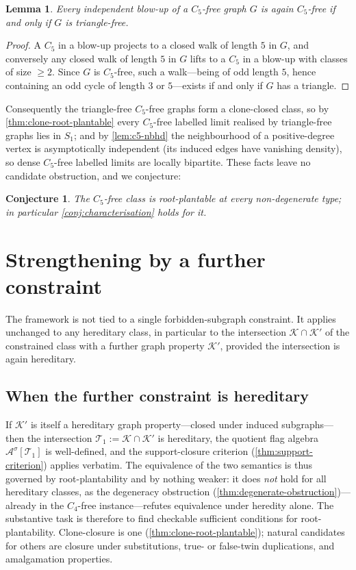 \documentclass[11pt]{article}
\newtheorem{lemma}[theorem]{Lemma}
\newtheorem{conjecture}[theorem]{Conjecture}
\theoremstyle{definition}
\newcommand{\A}{\mathcal{A}}
\newcommand{\K}{\mathcal{K}}
\newcommand{\T}{\mathcal{T}}
\begin{document}
\begin{lemma}\label{lem:c5-blowup}
Every independent blow-up of a $C_5$-free graph $G$ is again $C_5$-free if and only
if $G$ is triangle-free.
\end{lemma}

\begin{proof}
A $C_5$ in a blow-up projects to a closed walk of length $5$ in $G$, and conversely
any closed walk of length $5$ in $G$ lifts to a $C_5$ in a blow-up with classes of
size $\ge2$.  Since $G$ is $C_5$-free, such a walk---being of odd length $5$, hence
containing an odd cycle of length $3$ or $5$---exists if and only if $G$ has a
triangle.
\end{proof}

Consequently the triangle-free $C_5$-free graphs form a clone-closed class, so by
\cref{thm:clone-root-plantable} every $C_5$-free labelled limit realised by
triangle-free graphs lies in $S_1$; and by \cref{lem:c5-nbhd} the
neighbourhood of a positive-degree vertex is asymptotically independent (its induced
edges have vanishing density), so dense $C_5$-free labelled limits are locally bipartite.
These facts leave no candidate obstruction, and we conjecture:

\begin{conjecture}\label{conj:c5}
The $C_5$-free class is root-plantable at every non-degenerate type; in particular
\cref{conj:characterisation} holds for it.
\end{conjecture}

\section{Strengthening by a further constraint}

The framework is not tied to a single forbidden-subgraph constraint.  It applies
unchanged to any hereditary class, in particular to the intersection $\K\cap\K'$ of the
constrained class with a further graph property $\K'$, provided the intersection is again
hereditary.

\subsection{When the further constraint is hereditary}

If $\K'$ is itself a hereditary graph property---closed under induced subgraphs---then the
intersection $\T_1:=\K\cap\K'$ is hereditary, the quotient flag algebra $\A^\sigma[\T_1]$
is well-defined, and the support-closure criterion (\cref{thm:support-criterion}) applies
verbatim.  The equivalence of the two semantics is thus governed by root-plantability and
by nothing weaker: it does \emph{not} hold for all hereditary classes, as the degeneracy
obstruction (\cref{thm:degenerate-obstruction})---already in the $C_4$-free
instance---refutes equivalence under heredity alone.  The substantive task is therefore
to find checkable sufficient conditions for root-plantability.  Clone-closure is one
(\cref{thm:clone-root-plantable}); natural candidates for others are closure under
substitutions, true- or false-twin duplications, and amalgamation properties.
\end{document}
